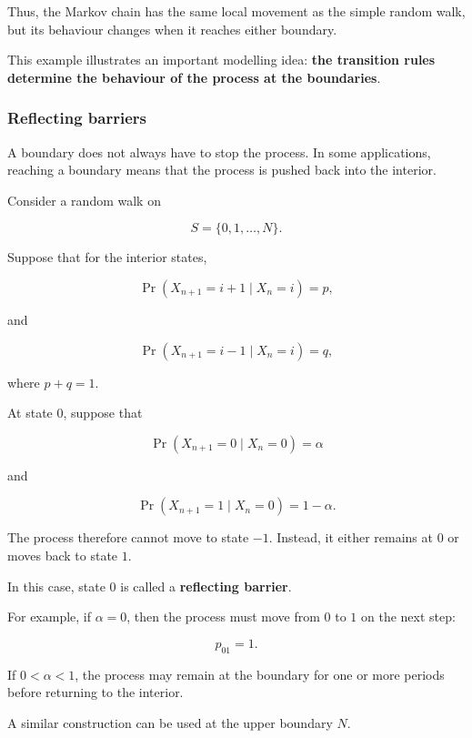 \documentclass[
  letterpaper,
  DIV=11,
  numbers=noendperiod]{scrartcl}
\theoremstyle{definition}
\theoremstyle{remark}
\begin{document}
Thus, the Markov chain has the same local movement as the simple random
walk, but its behaviour changes when it reaches either boundary.

This example illustrates an important modelling idea: \textbf{the
transition rules determine the behaviour of the process at the
boundaries}.

\subsubsection{Reflecting barriers}\label{reflecting-barriers}

A boundary does not always have to stop the process. In some
applications, reaching a boundary means that the process is pushed back
into the interior.

Consider a random walk on

\[
S=\{0,1,\ldots,N\}.
\]

Suppose that for the interior states,

\[
\Pr(X_{n+1}=i+1\mid X_n=i)=p,
\]

and

\[
\Pr(X_{n+1}=i-1\mid X_n=i)=q,
\]

where \(p+q=1\).

At state \(0\), suppose that

\[
\Pr(X_{n+1}=0\mid X_n=0)=\alpha
\]

and

\[
\Pr(X_{n+1}=1\mid X_n=0)=1-\alpha.
\]

The process therefore cannot move to state \(-1\). Instead, it either
remains at \(0\) or moves back to state \(1\).

In this case, state \(0\) is called a \textbf{reflecting barrier}.

For example, if \(\alpha=0\), then the process must move from \(0\) to
\(1\) on the next step:

\[
p_{01}=1.
\]

If \(0<\alpha<1\), the process may remain at the boundary for one or
more periods before returning to the interior.

A similar construction can be used at the upper boundary \(N\).
\end{document}
